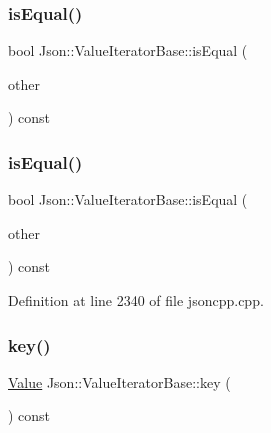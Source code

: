 \subsubsection{\texorpdfstring{is\+Equal()}{isEqual()}\hspace{0.1cm}{\footnotesize\ttfamily [1/2]}}
{\footnotesize\ttfamily bool Json\+::\+Value\+Iterator\+Base\+::is\+Equal (\begin{DoxyParamCaption}\item[{const \hyperlink{class_json_1_1_value_iterator_base_a9d2a940d03ea06d20d972f41a89149ee}{Self\+Type} \&}]{other }\end{DoxyParamCaption}) const\hspace{0.3cm}{\ttfamily [protected]}}

\hypertarget{class_json_1_1_value_iterator_base_a010b5ad3f3337ae3732e5d7e16ca5e25}{}\label{class_json_1_1_value_iterator_base_a010b5ad3f3337ae3732e5d7e16ca5e25} 
\subsubsection{\texorpdfstring{is\+Equal()}{isEqual()}\hspace{0.1cm}{\footnotesize\ttfamily [2/2]}}
{\footnotesize\ttfamily bool Json\+::\+Value\+Iterator\+Base\+::is\+Equal (\begin{DoxyParamCaption}\item[{const \hyperlink{class_json_1_1_value_iterator_base_a9d2a940d03ea06d20d972f41a89149ee}{Self\+Type} \&}]{other }\end{DoxyParamCaption}) const\hspace{0.3cm}{\ttfamily [protected]}}



Definition at line 2340 of file jsoncpp.\+cpp.

\hypertarget{class_json_1_1_value_iterator_base_a3838ba39c43c518cf3ed4aa6ce78ccad}{}\label{class_json_1_1_value_iterator_base_a3838ba39c43c518cf3ed4aa6ce78ccad} 
\subsubsection{\texorpdfstring{key()}{key()}\hspace{0.1cm}{\footnotesize\ttfamily [1/2]}}
{\footnotesize\ttfamily \hyperlink{class_json_1_1_value}{Value} Json\+::\+Value\+Iterator\+Base\+::key (\begin{DoxyParamCaption}{ }\end{DoxyParamCaption}) const}

